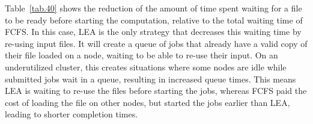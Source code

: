 \documentclass[conference]{IEEEtran}
\newcommand{\us}{\ensuremath{\mathit{user~session}}\xspace}
\newcommand{\rev}[1]{{\color{black}{#1}}}
\begin{document}
\begin{table}
\caption{Percentage reduction in data transfer time relative to FCFS at week 40.}\label{tab.40}
\end{table}

Table~\ref{tab.40} shows the reduction of the amount of time spent 
waiting for a file to be ready before starting the computation,
relative to the total waiting time of FCFS.
In this case, LEA is the only strategy that decreases this waiting time by re-using input files.
It will create a queue of jobs that already have a valid copy of their file loaded on a node, waiting to be able to re-use their input.
On an underutilized cluster, this creates situations where some nodes are idle while submitted jobs wait in a queue,
resulting in increased queue times.
This means LEA is waiting to re-use the files before starting the jobs,
whereas FCFS paid the cost of loading the file on other nodes, but started the jobs
earlier than LEA, leading to shorter completion times.
\end{document}
